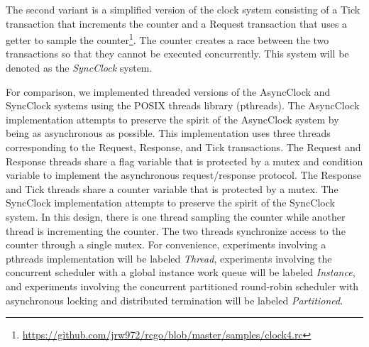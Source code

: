 The second variant is a simplified version of the clock system consisting of a Tick transaction that increments the counter and a Request transaction that uses a getter to sample the counter\footnote{\href{https://github.com/jrw972/rcgo/blob/master/samples/clock4.rc}{https://github.com/jrw972/rcgo/blob/master/samples/clock4.rc}}.
The counter creates a race between the two transactions so that they cannot be executed concurrently.
This system will be denoted as the \emph{SyncClock} system.

For comparison, we implemented threaded versions of the AsyncClock and SyncClock systems using the POSIX threads library (pthreads).
The AsyncClock implementation attempts to preserve the spirit of the AsyncClock system by being as asynchronous as possible.
This implementation uses three threads corresponding to the Request, Response, and Tick transactions.
The Request and Response threads share a flag variable that is protected by a mutex and condition variable to implement the asynchronous request/response protocol.
The Response and Tick threads share a counter variable that is protected by a mutex.
The SyncClock implementation attempts to preserve the spirit of the SyncClock system.
In this design, there is one thread sampling the counter while another thread is incrementing the counter.
The two threads synchronize access to the counter through a single mutex.
For convenience, experiments involving a pthreads implementation will be labeled \emph{Thread}, experiments involving the concurrent scheduler with a global instance work queue will be labeled \emph{Instance}, and experiments involving the concurrent partitioned  round-robin scheduler with asynchronous locking and distributed termination will be labeled \emph{Partitioned}.

